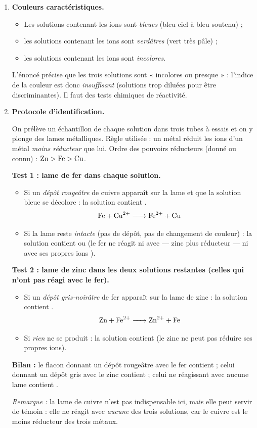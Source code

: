 \documentclass[11pt]{article}
\begin{document}
\begin{corrige}
\begin{enumerate}
\item \textbf{Couleurs caractéristiques.}
\begin{itemize}
\item Les solutions contenant les ions  sont \emph{bleues} (bleu ciel à bleu soutenu) ;
\item les solutions contenant les ions  sont \emph{verdâtres} (vert très pâle) ;
\item les solutions contenant les ions  sont \emph{incolores}.
\end{itemize}
L'énoncé précise que les trois solutions sont « incolores ou presque » : l'indice de la couleur est donc \emph{insuffisant} (solutions trop diluées pour être discriminantes). Il faut des tests chimiques de réactivité.

\item \textbf{Protocole d'identification.}

On prélève un échantillon de chaque solution dans trois tubes à essais et on y plonge des lames métalliques. Règle utilisée : un métal réduit les ions d'un métal \emph{moins réducteur} que lui. Ordre des pouvoirs réducteurs (donné ou connu) : $\ce{Zn} > \ce{Fe} > \ce{Cu}$.

\textbf{Test 1 : lame de fer dans chaque solution.}
\begin{itemize}
\item Si un \emph{dépôt rougeâtre} de cuivre apparaît sur la lame et que la solution bleue se décolore : la solution contient .
\[ \ce{Fe + Cu^2+ -> Fe^2+ + Cu} \]
\item Si la lame reste \emph{intacte} (pas de dépôt, pas de changement de couleur) : la solution contient  ou  (le fer ne réagit ni avec  --- zinc plus réducteur --- ni avec ses propres ions ).
\end{itemize}

\textbf{Test 2 : lame de zinc dans les deux solutions restantes (celles qui n'ont pas réagi avec le fer).}
\begin{itemize}
\item Si un \emph{dépôt gris-noirâtre} de fer apparaît sur la lame de zinc : la solution contient .
\[ \ce{Zn + Fe^2+ -> Zn^2+ + Fe} \]
\item Si \emph{rien} ne se produit : la solution contient  (le zinc ne peut pas réduire ses propres ions).
\end{itemize}

\textbf{Bilan :} le flacon donnant un dépôt rougeâtre avec le fer contient  ; celui donnant un dépôt gris avec le zinc contient  ; celui ne réagissant avec aucune lame contient .

\emph{Remarque :} la lame de cuivre n'est pas indispensable ici, mais elle peut servir de témoin : elle ne réagit avec \emph{aucune} des trois solutions, car le cuivre est le moins réducteur des trois métaux.
\end{enumerate}
\end{corrige}
\end{document}
